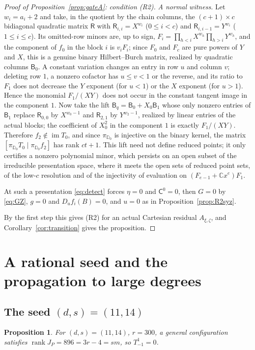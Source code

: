 \documentclass{amsart}
\newtheorem{proposition}[theorem]{Proposition}
\theoremstyle{definition}
\theoremstyle{remark}
\numberwithin{equation}{section}
\newcommand{\CC}{\mathbb{C}}
\DeclareMathOperator{\rank}{rank}
\begin{document}
\begin{proof}[Proof of Proposition~\ref{prop:gateA}: condition (R2)]
\emph{A normal witness.} Let $w_i=a_i+2$ and take, in the quotient by the chain columns,
the $(c+1)\times c$ bidiagonal quadratic matrix $\mathsf R$ with $\mathsf R_{i,i}=X^{w_i}$
($0\le i<c$) and $\mathsf R_{i,i-1}=Y^{w_i}$ ($1\le i\le c$). Its omitted-row minors are,
up to sign, $F_i=\prod_{h<i}X^{w_h}\prod_{h>i}Y^{w_h}$, and the component of $f_0$ in the
block $i$ is $v_iF_i$; since $F_0$ and $F_c$ are pure powers of $Y$ and $X$, this is a
genuine binary Hilbert--Burch matrix, realized by quadratic columns $\mathsf B_0$. A
constant variation changes an entry in row $u$ and column $v$; deleting row $1$, a nonzero
cofactor has $u\le v<1$ or the reverse, and its ratio to $F_1$ does not decrease the $Y$
exponent (for $u<1$) or the $X$ exponent (for $u>1$). Hence the monomial $F_1/(XY)$ does
not occur in the constant tangent image in the component $1$. Now take the lift
$\mathsf B_q=\mathsf B_0+X_0\mathsf B_1$ whose only nonzero entries of $\mathsf B_1$ replace
$\mathsf R_{0,0}$ by $X^{w_0-1}$ and $\mathsf R_{2,1}$ by $Y^{w_2-1}$, realized by linear
entries of the actual blocks; the coefficient of $X_0^2$ in the component $1$ is exactly
$F_1/(XY)$. Therefore $f_2\notin\operatorname{im}T_0$, and since
$\pi_{\mathbb D_0}$ is injective on the binary kernel, the matrix
$[\pi_{\mathbb D_0}T_0\mid\pi_{\mathbb D_0}f_2]$ has rank $ct+1$. This lift need not define
reduced points; it only certifies a nonzero polynomial minor, which persists on an open
subset of the irreducible presentation space, where it meets the open sets of reduced point
sets, of the low-$c$ resolution and of the injectivity of evaluation on
$(F_{e-1}+\CC x^e)F_1$.

At such a presentation \eqref{eq:detect} forces $\eta=0$ and $\mathsf C^0=0$, then $G=0$
by \eqref{eq:GZ}, $g=0$ and $D_uf_i(B)=0$, and $u=0$ as in Proposition~\ref{prop:R2syz}.

By the first step this gives (R2) for an actual Cartesian residual $A_{\xi,\zeta}$, and
Corollary~\ref{cor:transition} gives the proposition.
\end{proof}

\section{A rational seed and the propagation to large degrees}\label{sec:seed}

\subsection{The seed \texorpdfstring{$(d,s)=(11,14)$}{(d,s)=(11,14)}}
\begin{proposition}\label{prop:seed}
For $(d,s)=(11,14)$, $r=300$, a general configuration satisfies
$\rank J_P=896=3r-4=sm$, so $T^1_{-1}=0$.
\end{proposition}
\end{document}
